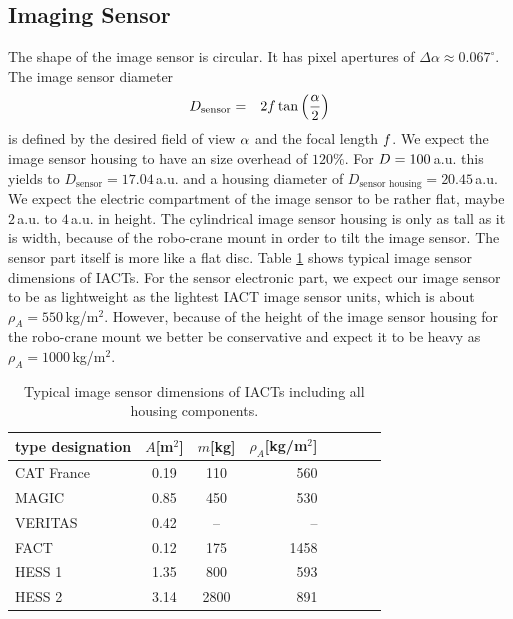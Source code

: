 \documentclass[11pt,a4paper,oneside,titlepage]{article}
\begin{document}
\subsection{Imaging Sensor}
%
The shape of the image sensor is circular. It has pixel apertures of \mbox{$\Delta \alpha \approx 0.067^\circ$}.
%
The image sensor diameter 
%
\begin{eqnarray}
D_\text{sensor} &=& 2 f \tan \left( \frac{\alpha} {2}\right)
\end{eqnarray}
%
is defined by the desired field of view $\alpha$ and the focal length $f$. 
%
We expect the image sensor housing to have an size overhead of $120\%$. 
%
For $D=100\,$a.u. this yields to \mbox{$D_\text{sensor} = 17.04\,$a.u.} and a housing diameter of \mbox{$D_\text{sensor housing} = 20.45\,$a.u.}
%
We expect the electric compartment of the image sensor to be rather flat, maybe $2\,$a.u. to $4\,$a.u. in height.
%
The cylindrical image sensor housing is only as tall as it is width, because of the robo-crane mount in order to tilt the image sensor.
%
The sensor part itself is more like a flat disc.
%
Table \ref{TabFullImageSensors} shows typical image sensor dimensions of IACTs.
%
For the sensor electronic part, we expect our image sensor to be as lightweight as the lightest IACT image sensor units, which is about $\rho_A = 550\,$kg/m$^2$.
%
However, because of the height of the image sensor housing for the robo-crane mount we better be conservative and expect it to be heavy as $\rho_A = 1000\,$kg/m$^2$. 
%
\begin{table}[H]
    \begin{center}
        \begin{tabular}{lccrrrrr}
            type designation & $A$[m$^2$] & $m$[kg] & $\rho_A$[kg/m$^2$]\\
            \toprule
            CAT France & 0.19 & 110 & 560\\
            MAGIC      & 0.85 & 450 & 530\\ 
            VERITAS    & 0.42 & -- & -- \\ 
            FACT       & 0.12 & 175 & 1458\\
            HESS 1     & 1.35 & 800 & 593\\ 
            HESS 2     & 3.14 & 2800 & 891\\ 
            \bottomrule
        \end{tabular}
        \caption[]{Typical image sensor dimensions of IACTs including all housing components.}
        \label{TabFullImageSensors}
    \end{center}
\end{table}
\end{document}
